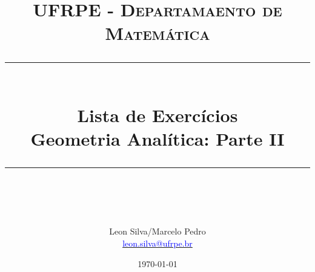 \documentclass[paper=a4, fontsize=11pt]{scrartcl} %
\begin{document}
\newcommand{\horrule}[1]{\rule{\linewidth}{#1}} %

\title{	
\normalfont \normalsize 
\textsc{UFRPE - Departamaento de Matemática} \\ [25pt] %
\horrule{0.5pt} \\[0.1cm] %
\huge Lista de Exercícios\\ Geometria Analítica: Parte II \\ %
\horrule{2pt} \\[0.5cm] %
}

\author{Leon Silva/Marcelo Pedro\\\href{mailto:leon.silva@ufrpe.br}{\textcolor{blue}{leon.silva@ufrpe.br}}} %

\date{\normalsize\today} %



\maketitle 
\begin{enumerate}[labelwidth=0.5cm,align=left]
%

\end{enumerate}

\end{document}
